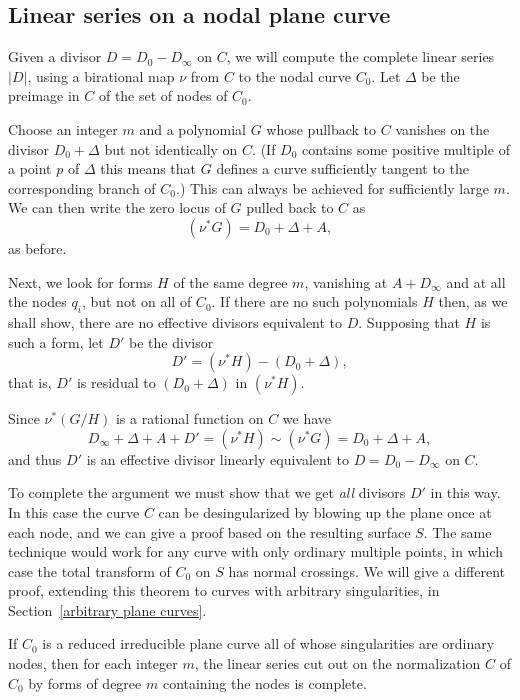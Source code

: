 \subsection{Linear series on a nodal plane curve}\label{linear series on nodal plane curves}

Given a divisor $D = D_{0}-D_{\infty}$ on $C$, we will compute the complete linear series $|D|$, using a birational map $\nu$ from 
$C$ to the nodal curve $C_0$. Let $\Delta$ be the preimage in $C$ of the set of nodes of $C_{0}$.

Choose an integer $m$ and a polynomial $G$ whose pullback to $C$
  vanishes on the divisor $D_0+\Delta$ 
 but not identically on $C$. (If $D_0$ contains some positive multiple of a point $p$ of $\Delta$ this means that $G$ defines
 a curve sufficiently tangent to the corresponding branch of $C_0$.) This can always be achieved for
 sufficiently large $m$. We can then write the zero locus of $G$ pulled back to $C$ as
$$
(\nu^*G) = D_0 + \Delta + A,
$$
as before. 


Next, we look for forms $H$ of the same degree $m$, vanishing at $A+D_\infty$ and at all the nodes $q_i$,  but not on all of $C_0$. If there are no such polynomials $H$ then, as we shall show,
there are no effective divisors equivalent to $D$. Supposing that $H$ is such a form, let $D'$ be the divisor 
$$
D' = (\nu^*H) -( D_0 + \Delta),
$$
that is, $D'$ is residual to $( D_0 + \Delta)$ in $(\nu^*H)$. 

Since $\nu^*(G/H)$ is a rational function on $C$ we have
$$
D_\infty +\Delta + A+ D' = (\nu^*H) \sim (\nu^*G) = D_0 + \Delta + A,
$$
and thus $D'$ is an effective divisor linearly equivalent to $D = D_{0}-D_{\infty}$ on $C$.

To complete the argument we must show that we get \emph{all} divisors $D'$ in this way.
In this case the curve $C$ can be desingularized by blowing up the plane once at each node,
and we can give a proof based on the resulting surface $S$. The same technique would work for any curve with only
ordinary multiple points, in which case the total transform of $C_{0}$ on $S$ has normal crossings. We will give a different proof, extending this theorem to curves with arbitrary singularities, in Section~\ref{arbitrary plane curves}.

\begin{proposition}\label{adjoint completeness1}
If $C_{0}$ is a reduced irreducible plane curve all of whose singularities are ordinary nodes, then for each
integer $m$,
the linear series cut out on the normalization $C$ of $C_{0}$ by forms of degree $m$ containing the nodes
is complete.
\end{proposition}

